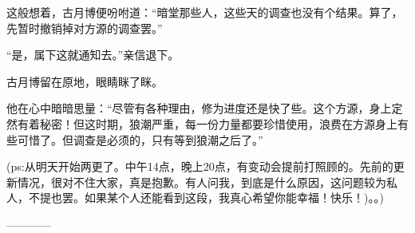 \begin{this_body}
这般想着，古月博便吩咐道：“暗堂那些人，这些天的调查也没有个结果。算了，先暂时撤销掉对方源的调查罢。”

“是，属下这就通知去。”亲信退下。

古月博留在原地，眼睛眯了眯。

他在心中暗暗思量：“尽管有各种理由，修为进度还是快了些。这个方源，身上定然有着秘密！但这时期，狼潮严重，每一份力量都要珍惜使用，浪费在方源身上有些可惜了。但调查是必须的，只有等到狼潮之后了。”

(ps:从明天开始两更了。中午14点，晚上20点，有变动会提前打照顾的。先前的更新情况，很对不住大家，真是抱歉。有人问我，到底是什么原因，这问题较为私人，不提也罢。如果某个人还能看到这段，我真心希望你能幸福！快乐！)。。)

------------

\end{this_body}

